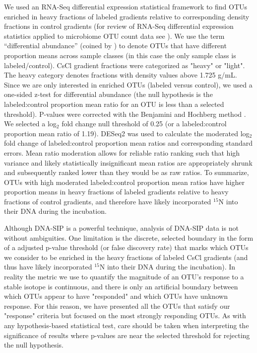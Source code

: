 We used an RNA-Seq differential expression statistical framework
\citep{Love_2014} to find OTUs enriched in heavy fractions of labeled
gradients relative to corresponding density fractions in control gradients
(for review of RNA-Seq differential expression statistics applied to
microbiome OTU count data see \citet{24699258}). We use the term
“differential abundance” (coined by \citet{24699258}) to denote OTUs that
have different proportion means across sample classes (in this case the only
sample class is labeled/control).  CsCl gradient fractions were categorized
as "heavy" or "light". The heavy category denotes fractions with density
values above 1.725 g/mL. Since we are only interested in enriched OTUs
(labeled versus control), we used a one-sided z-test for differential
abundance (the null hypothesis is the labeled:control proportion mean ratio
for an OTU is less than a selected threshold). P-values were corrected with
the Benjamini and Hochberg method \citep{citeulike:1042553}. We selected a
log$_{2}$ fold change null threshold of 0.25 (or a labeled:control proportion
mean ratio of 1.19). DESeq2 was used to calculate the moderated log$_{2}$
fold change of labeled:control proportion mean ratios and corresponding
standard errors. Mean ratio moderation allows for reliable ratio ranking such
that high variance and likely statistically insignificant mean ratios are
appropriately shrunk and subsequently ranked lower than they would be as raw
ratios. To summarize, OTUs with high moderated labeled:control proportion
mean ratios have higher proportion means in heavy fractions of labeled
gradients relative to heavy fractions of control gradients, and therefore
have likely incorporated $^{15}$N into their DNA during the incubation.

Although DNA-SIP is a powerful technique, analysis of DNA-SIP data is not
without ambiguities. One limitation is the discrete, selected boundary in the
form of a adjusted p-value threshold (or false discovery rate) that marks which
OTUs we consider to be enriched in the heavy fractions of labeled CsCl
gradients (and thus have likely incorporated $^{15}$N into their DNA during the
incubation). In reality the metric we use to quantify the magnitude of an OTU's
response to a stable isotope is continuous, and there is only an artificial
boundary between which OTUs appear to have "responded" and which OTUs have
unknown response. For this reason, we have presented all the OTUs that satisfy
our "response" criteria but focused on the most strongly responding OTUs. As
with any hypothesis-based statistical test, care should be taken when
interpreting the significance of results where p-values are near the selected
threshold for rejecting the null hypothesis.

